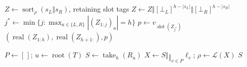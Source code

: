 \algcolstart
\begin{algorithm}[H]
\caption{Node Replay}
\label{alg:replay_segment_node}
$Z\leftarrow\operatorname{sort}_\rho(s_L\Vert s_R)$, retaining slot tags\;
$Z\leftarrow Z\Vert[\bot_L]^{h-|s_L|}\Vert[\bot_R]^{h-|s_R|}$\;
$j^*\leftarrow\min\{j:\max_{a\in\{L,R\}}|(Z_{1:j})_a|=h\}$\;
$p\leftarrow v_{\operatorname{slot}(Z_{j^*})}$\;
\Return $(\operatorname{real}(Z_{1:h}),\operatorname{real}(Z_{h+1:}),p)$\;
\end{algorithm}
\algcolend

\algcolstart
\begin{algorithm}[H]
\caption{Path Refresh}
\label{alg:refresh_loser_tree_path}
$P\leftarrow[\,]$; $u\leftarrow\operatorname{root}(T)$\;
$S\leftarrow\operatorname{take}_h(R_u)$\;
$X\leftarrow S\Vert\mathop{\Vert}_{v\in P}\ell_v$; $\rho\leftarrow\mathcal L(X)$\;
\Return $S$\;
\end{algorithm}
\algcolend
